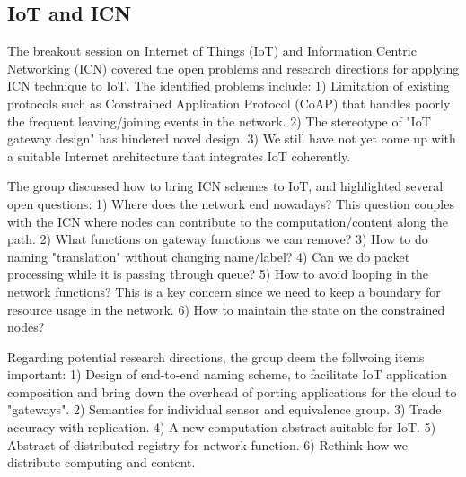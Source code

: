 \subsection{IoT and ICN}

The breakout session on Internet of Things (IoT) and Information Centric 
Networking (ICN) covered the open problems and research directions for
applying ICN technique to IoT. The identified problems include: 1) Limitation
of existing protocols such as Constrained Application Protocol (CoAP) that 
handles poorly the frequent leaving/joining events in the network. 2) The 
stereotype of "IoT gateway design" has hindered novel design. 3) We still
have not yet come up with a suitable Internet architecture that integrates
IoT coherently.

The group discussed how to bring ICN schemes to IoT, and highlighted several 
open questions: 1) Where does the network end nowadays? This question couples 
with the ICN where nodes can contribute to the computation/content along 
the path. 2) What functions on gateway functions we can remove? 3) How to do 
naming "translation" without changing name/label? 4) Can we do packet 
processing while it is passing through queue? 5) How to avoid looping in 
the network functions? This is a key concern since we need to keep a 
boundary for resource usage in the network. 6) How to maintain the state on 
the constrained nodes?

Regarding potential research directions, the group deem the follwoing items
important: 1) Design of end-to-end naming scheme, to facilitate IoT 
application composition and bring down the overhead of porting applications 
for the cloud to "gateways". 2) Semantics for individual sensor and 
equivalence group. 3) Trade accuracy with replication. 4) A new computation 
abstract suitable for IoT. 5) Abstract of distributed registry for network 
function. 6) Rethink how we distribute computing and content.








